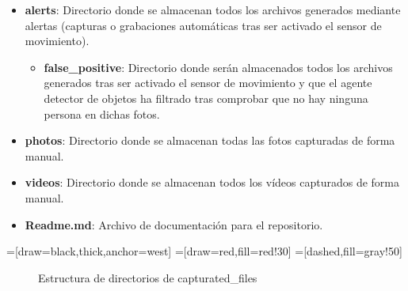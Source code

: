 \begin{itemize}
\item \textbf{alerts}: Directorio donde se almacenan todos los archivos generados mediante alertas (capturas o grabaciones automáticas tras ser activado el sensor de movimiento).

	\begin{itemize}
	\item \textbf{false\_positive}: Directorio donde serán almacenados todos los archivos generados tras ser activado el sensor de movimiento y que el agente detector de objetos ha filtrado tras comprobar que no hay ninguna persona en dichas fotos.
	\end{itemize}

\item \textbf{photos}: Directorio donde se almacenan todas las fotos capturadas de forma manual.

\item \textbf{videos}: Directorio donde se almacenan todos los vídeos capturados de forma manual.

\item \textbf{Readme.md}: Archivo de documentación para el repositorio.

\end{itemize}



=[draw=black,thick,anchor=west]
=[draw=red,fill=red!30]
=[dashed,fill=gray!50]

\begin{figure}[H]
\centering

\caption{Estructura de directorios de capturated\_files} \label{fig:tik1}
\end{figure}

